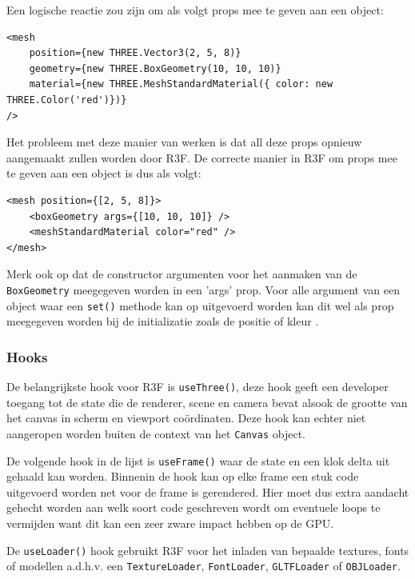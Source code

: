 Een logische reactie zou zijn om als volgt props mee te geven aan een object:

\begin{lstlisting}
<mesh
	position={new THREE.Vector3(2, 5, 8)}
	geometry={new THREE.BoxGeometry(10, 10, 10)}
	material={new THREE.MeshStandardMaterial({ color: new THREE.Color('red')})}
/>
\end{lstlisting}

Het probleem met deze manier van werken is dat all deze props opnieuw aangemaakt zullen worden door R3F. De correcte manier in R3F om props mee te geven aan een object is dus als volgt:

\begin{lstlisting}
<mesh position={[2, 5, 8]}>
	<boxGeometry args={[10, 10, 10]} />
	<meshStandardMaterial color="red" />
</mesh>
\end{lstlisting}

Merk ook op dat de constructor argumenten voor het aanmaken van de \texttt{BoxGeometry} meegegeven worden in een 'args' prop. Voor alle argument van een object waar een \texttt{set()} methode kan op uitgevoerd worden kan dit wel als prop meegegeven worden bij de initializatie zoals de positie of kleur \autocite{reactThreeFiber2023}.

\subsubsection{Hooks}

De belangrijkste hook voor R3F is \texttt{useThree()}, deze hook geeft een developer toegang tot de state die de renderer, scene en camera bevat alsook de grootte van het canvas in scherm en viewport coördinaten. Deze hook kan echter niet aangeropen worden buiten de context van het \texttt{Canvas} object.

De volgende hook in de lijst is \texttt{useFrame()} waar de state en een klok delta uit gehaald kan worden. Binnenin de hook kan op elke frame een stuk code uitgevoerd worden net voor de frame is gerendered. Hier moet dus extra aandacht gehecht worden aan welk soort code geschreven wordt om eventuele loops te vermijden want dit kan een zeer zware impact hebben op de GPU.

De \texttt{useLoader()} hook gebruikt R3F voor het inladen van bepaalde textures, fonts of modellen a.d.h.v. een \texttt{TextureLoader}, \texttt{FontLoader}, \texttt{GLTFLoader} of \texttt{OBJLoader}.
